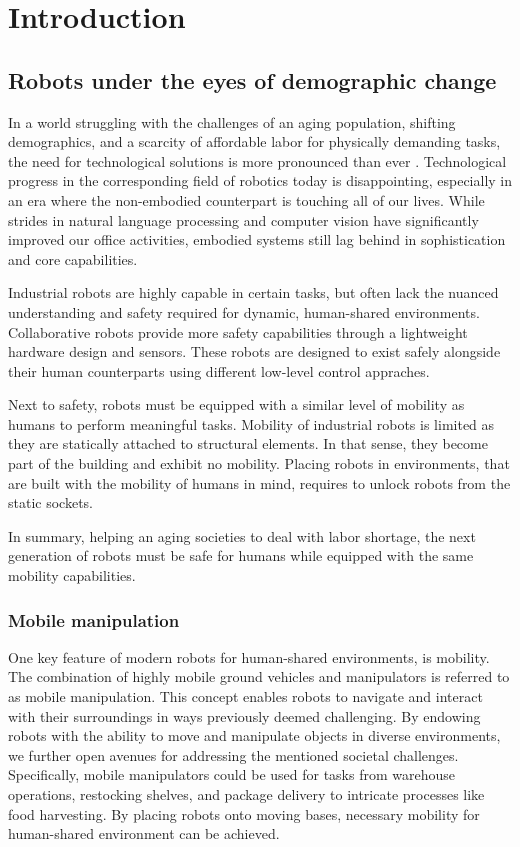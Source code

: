 \chapter{Introduction} %
\label{cha:Introduction}

\section{Robots under the eyes of demographic change}

In a world struggling with the challenges of an aging
population, shifting demographics, and a scarcity of
affordable labor for physically demanding tasks, the need
for technological solutions is more pronounced than ever
\cite{ince2015economic}.
Technological progress in the corresponding field of
robotics today is disappointing, especially in an era where
the non-embodied counterpart is touching all of our lives.
While strides in natural language processing and computer
vision have significantly improved our office activities,
embodied systems still lag behind in sophistication and core
capabilities.

Industrial robots are highly capable in certain tasks, but
often lack the nuanced understanding and safety required for
dynamic, human-shared environments. Collaborative robots
provide more safety capabilities through a lightweight
hardware design and sensors. These
robots are designed to exist safely alongside their human
counterparts using different low-level control appraches.

Next to
safety, robots must be equipped with a similar level of
mobility as humans to perform meaningful tasks. Mobility of
industrial robots is limited as they are statically
attached to structural elements. In that sense, they become
part of the building and exhibit no mobility. Placing
robots in environments, that are built with the mobility of
humans in mind, requires to unlock robots from the static
sockets.

In summary, helping an aging societies to deal with labor
shortage, the next generation of robots must be safe for
humans while equipped with the same mobility capabilities.

\subsection{Mobile manipulation}
\label{sec:mobile_manipulation}

One key feature of modern robots for human-shared
environments, is mobility. The combination of highly mobile
ground vehicles and manipulators is referred to as mobile
manipulation. This concept enables robots to navigate and
interact with their surroundings in ways previously deemed
challenging. By endowing robots with the ability to move and
manipulate objects in diverse environments, we further open
avenues for addressing the mentioned societal challenges.
Specifically, mobile manipulators could be used for tasks
from warehouse operations, restocking shelves, and package
delivery to intricate processes like food harvesting.
By placing robots onto moving bases, necessary mobility for
human-shared environment can be achieved.

